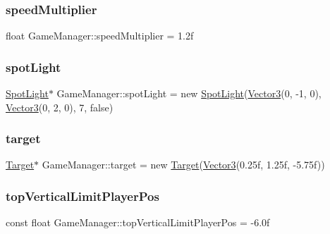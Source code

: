 \subsubsection{\texorpdfstring{speed\+Multiplier}{speedMultiplier}}
{\footnotesize\ttfamily float Game\+Manager\+::speed\+Multiplier = 1.\+2f}

\mbox{\label{class_game_manager_a88429d344ac8ceb5a5a65ccc86105655}} 
\subsubsection{\texorpdfstring{spot\+Light}{spotLight}}
{\footnotesize\ttfamily \hyperlink{class_spot_light}{Spot\+Light}$\ast$ Game\+Manager\+::spot\+Light = new \hyperlink{class_spot_light}{Spot\+Light}(\hyperlink{class_vector3}{Vector3}(0, -\/1, 0), \hyperlink{class_vector3}{Vector3}(0, 2, 0), 7, false)}

\mbox{\label{class_game_manager_a4989ddffb424aa668ac66107e6a0eb6f}} 
\subsubsection{\texorpdfstring{target}{target}}
{\footnotesize\ttfamily \hyperlink{class_target}{Target}$\ast$ Game\+Manager\+::target = new \hyperlink{class_target}{Target}(\hyperlink{class_vector3}{Vector3}(0.\+25f, 1.\+25f, -\/5.\+75f))}

\mbox{\label{class_game_manager_a34e763c41e51dccf7241b784de62e381}} 
\subsubsection{\texorpdfstring{top\+Vertical\+Limit\+Player\+Pos}{topVerticalLimitPlayerPos}}
{\footnotesize\ttfamily const float Game\+Manager\+::top\+Vertical\+Limit\+Player\+Pos = -\/6.\+0f}

\mbox{\label{class_game_manager_a47719947c503583906c085b293759de2}} 
